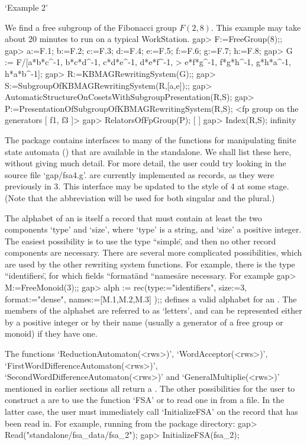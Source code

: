 `Example 2'

We find a free subgroup of the Fibonacci group $F(2,8)$. This example may
take about 20 minutes to run on a typical WorkStation.
\beginexample
gap> F:=FreeGroup(8);;
gap> a:=F.1; b:=F.2; c:=F.3; d:=F.4; e:=F.5; f:=F.6; g:=F.7; h:=F.8;
gap> G := F/[a*b*c^-1, b*c*d^-1, c*d*e^-1, d*e*f^-1,
>            e*f*g^-1, f*g*h^-1, g*h*a^-1, h*a*b^-1];
gap> R:=KBMAGRewritingSystem(G);;
gap> S:=SubgroupOfKBMAGRewritingSystem(R,[a,e]);;
gap> AutomaticStructureOnCosetsWithSubgroupPresentation(R,S);
gap> P:=PresentationOfSubgroupOfKBMAGRewritingSystem(R,S);
<fp group on the generators [ f1, f3 ]>
gap> RelatorsOfFpGroup(P);
[  ]
gap> Index(R,S);                                 
infinity

\endexample



The {\KBMAG} package contains {\GAP} interfaces to many of the functions
for manipulating finite state automata ({\fsa}) that are available in the
standalone. We shall list these here, without giving much detail.
For more detail, the user could try looking in the source file
`gap/fsa4.g'.
{\fsa} are currently implemented as {\GAP} records, as they were
previously in {\GAP}3. This interface may be updated to the style of
{\GAP}4 at some stage. (Note that the abbreviation {\fsa} will be used for
both singular and the plural.)

The alphabet of an {\fsa} is itself a record that must contain at least
the two components `type' and `size', where `type' is a string, and
`size' a positive integer. The easiest possibility is to use the
type ``simple\", and then no other record components are necessary.
There are several more complicated possibilities, which are used by
the other rewriting system functions. For example, there is the type
``identifiers\", for which fields ``format\" and ``names\" are necessary.
For example
\beginexample
    gap> M:=FreeMonoid(3);;
    gap> alph := rec(type:="identifiers", size:=3,
                     format:="dense", names:=[M.1,M.2,M.3] );;
\endexample
defines a valid alphabet for an {\fsa}.
The members of the alphabet are referred to as `letters', and can be
represented either by a positive integer or by their name (usually
a generator of a free group or monoid) if they have one.

The functions `ReductionAutomaton(<rws>)',  `WordAcceptor(<rws>)',
`FirstWordDifferenceAutomaton(<rws>)', `SecondWordDifferenceAutomaton(<rws>)'
and `GeneralMultiplie(<rws>)' mentioned in earlier sections all
return a {\fsa}. The other possibilities for the user to construct
a {\fsa} are to use the function `FSA' or to read one in from a file.
In the latter case, the user must immediately call `InitializeFSA'
on the record that has been read in. For example, running {\GAP} from the
package directory:
\beginexample
    gap> Read("standalone/fsa_data/fsa_2");
    gap> InitializeFSA(fsa_2);
\endexample

